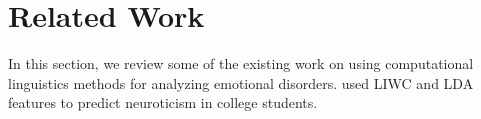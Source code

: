 \section{Related Work}
\label{sec:relatedwork}

In this section, we review some of the existing work on using computational linguistics methods for analyzing emotional disorders. \cite{Resnik et. al.} used LIWC and LDA features to predict neuroticism in college students.  